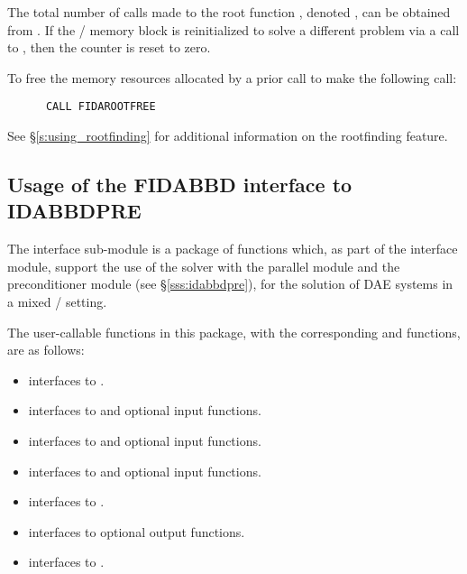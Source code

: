 The total number of calls made to the root function ,
denoted , can be obtained from .
If the {\fida}/{\ida} memory block is reinitialized to solve a
different problem via a call to , then the counter
 is reset to zero.

To free the memory resources allocated by a prior call to  make
the following call:
\begin{verbatim}
      CALL FIDAROOTFREE
\end{verbatim}
See \S\ref{s:using_rootfinding} for additional information on the
rootfinding feature.



\subsection{Usage of the FIDABBD interface to IDABBDPRE}

The {\fidabbd} interface sub-module is a package of {\C} functions which,
as part of the {\fida} interface module, support the use of the
{\ida} solver with the parallel {\nvecp} module and the {\idabbdpre} 
preconditioner module (see \S\ref{sss:idabbdpre}), for the solution of 
DAE systems in a mixed {\F}/{\C} setting.  

The user-callable functions in this package, with the corresponding
{\ida} and {\idabbdpre} functions, are as follows: 
\begin{itemize}
\item {}
  interfaces to .
\item {}
  interfaces to  and {\spgmr} optional input functions.
\item {}
  interfaces to  and {\spbcg} optional input functions.
\item {}
  interfaces to  and {\sptfqmr} optional input functions.
\item {}
  interfaces to .
\item {}
  interfaces to {\idabbdpre} optional output functions.
\item {}
  interfaces to .
\end{itemize}

